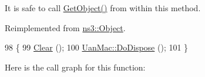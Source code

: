 It is safe to call \hyperlink{classns3_1_1Object_a13e18c00017096c8381eb651d5bd0783}{Get\+Object()} from within this method. 

Reimplemented from \hyperlink{classns3_1_1Object_a475d429a75d302d4775f4ae32479b287}{ns3\+::\+Object}.


\begin{DoxyCode}
98 \{
99   \hyperlink{classns3_1_1UanMacRcGw_a1b55372d9c1a92d9e95cf6dcabf9719b}{Clear} ();
100   \hyperlink{classns3_1_1Object_a475d429a75d302d4775f4ae32479b287}{UanMac::DoDispose} ();
101 \}
\end{DoxyCode}


Here is the call graph for this function\+:


